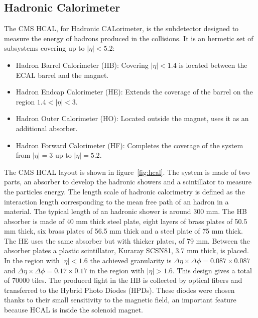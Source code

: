 
\subsection{Hadronic Calorimeter}
\label{sec:hcal}

The CMS HCAL, for Hadronic CALorimeter, is the subdetector designed to measure the energy of hadrons produced in the collisions. It is an hermetic set of subsystems covering up to $|\eta|<5.2$:
\begin{itemize}
\item Hadron Barrel Calorimeter (HB): Covering $|\eta|<1.4$ is located between the ECAL barrel and the magnet. 
\item Hadron Endcap Calorimeter (HE): Extends the coverage of the barrel on the region $1.4<|\eta|<3$.
\item Hadron Outer Calorimeter (HO): Located outside the magnet, uses it as an additional absorber.
\item Hadron Forward Calorimeter (HF): Completes the coverage of the system from $|\eta|=3$ up to $|\eta|=5.2$.
\end{itemize}

The CMS HCAL layout is shown in figure~\ref{fig:hcal}. The system is made of two parts, an absorber to develop the hadronic showers and a scintillator to measure the particles energy. The length scale of hadronic calorimetry is defined as the interaction length corresponding to the mean free path of an hadron in a material. The typical length of an hadronic shower is around 300 mm. The HB absorber is made of 40 mm thick steel plate, eight layers of brass plates of 50.5 mm thick, six brass plates of 56.5 mm thick and a steel plate of 75 mm thick. The HE uses the same absorber but with thicker plates, of 79 mm. Between the absorber plates a plastic scintillator, Kuraray SCSN81, 3.7 mm thick, is placed. In the region with $|\eta|<1.6$ the achieved granularity is $\Delta\eta\times\Delta\phi=0.087\times 0.087$ and $\Delta\eta\times\Delta\phi=0.17\times 0.17$ in the region with $|\eta|>1.6$. This design gives a total of 70000 tiles. The produced light in the HB is collected by optical fibers and transferred to the Hybrid Photo Diodes (HPDs). These diodes were chosen thanks to their small sensitivity to the magnetic field, an important feature because HCAL is inside the solenoid magnet. %

